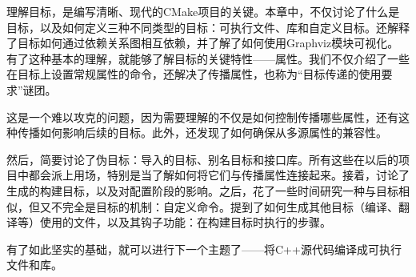 理解目标，是编写清晰、现代的CMake项目的关键。本章中，不仅讨论了什么是目标，以及如何定义三种不同类型的目标：可执行文件、库和自定义目标。还解释了目标如何通过依赖关系图相互依赖，并了解了如何使用Graphviz模块可视化。有了这种基本的理解，就能够了解目标的关键特性——属性。我们不仅介绍了一些在目标上设置常规属性的命令，还解决了传播属性，也称为“目标传递的使用要求”谜团。

这是一个难以攻克的问题，因为需要理解的不仅是如何控制传播哪些属性，还有这种传播如何影响后续的目标。此外，还发现了如何确保从多源属性的兼容性。

然后，简要讨论了伪目标：导入的目标、别名目标和接口库。所有这些在以后的项目中都会派上用场，特别是当了解如何将它们与传播属性连接起来。接着，讨论了生成的构建目标，以及对配置阶段的影响。之后，花了一些时间研究一种与目标相似，但又不完全是目标的机制：自定义命令。提到了如何生成其他目标（编译、翻译等）使用的文件，以及其钩子功能：在构建目标时执行的步骤。

有了如此坚实的基础，就可以进行下一个主题了——将C++源代码编译成可执行文件和库。